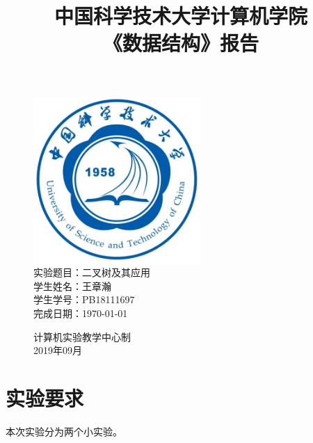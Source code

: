 \documentclass[UTF8]{article}
\title{中国科学技术大学计算机学院\\《数据结构》报告}
\author{}
\date{}
\begin{document}
\maketitle
	\begin{figure}[H]
		\centering
		\includegraphics[width=2.5in]{xiaohui.jpg}\vspace{0.5cm}\\
		\large{
			实验题目：二叉树及其应用\\
			学生姓名：王章瀚\\
			学生学号：PB18111697\\
			完成日期：\today\\
		}\vspace{2cm}
		
		\large{计算机实验教学中心制\\2019年09月\\}
		\thispagestyle{empty}
		\clearpage  %
	\end{figure}
	\newpage
	
	\section{实验要求}
	本次实验分为两个小实验。\par
\end{document}

